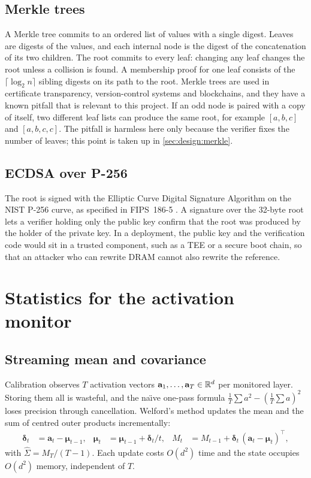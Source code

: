 \subsection{Merkle trees}
A Merkle tree \cite{merkle1987digital} commits to an ordered list of values with a single
digest. Leaves are digests of the values, and each internal node is the digest of the
concatenation of its two children. The root commits to every leaf: changing any leaf changes
the root unless a collision is found. A membership proof for one leaf consists of the
$\lceil\log_2 n\rceil$ sibling digests on its path to the root. Merkle trees are used in
certificate transparency, version-control systems and blockchains, and they have a known
pitfall that is relevant to this project. If an odd node is paired with a copy of itself, two
different leaf lists can produce the same root, for example $[a,b,c]$ and $[a,b,c,c]$. The
pitfall is harmless here only because the verifier fixes the number of leaves; this point is
taken up in \cref{sec:design:merkle}.

\subsection{ECDSA over P-256}
The root is signed with the Elliptic Curve Digital Signature Algorithm on the NIST P-256 curve,
as specified in FIPS~186-5 \cite{fips186-5}. A signature over the 32-byte root lets a verifier
holding only the public key confirm that the root was produced by the holder of the private
key. In a deployment, the public key and the verification code would sit in a trusted
component, such as a TEE or a secure boot chain, so that an attacker who can rewrite DRAM
cannot also rewrite the reference.

\section{Statistics for the activation monitor}
\label{sec:bg:stats}

\subsection{Streaming mean and covariance}
Calibration observes $T$ activation vectors $\mathbf{a}_1,\dots,\mathbf{a}_T\in\mathbb{R}^d$ per
monitored layer. Storing them all is wasteful, and the na\"\i ve one-pass formula
$\frac1T\sum a^2 - (\frac1T\sum a)^2$ loses precision through cancellation. Welford's method
\cite{welford1962note} updates the mean and the sum of centred outer products incrementally:
\begin{align}
  \boldsymbol\delta_t &= \mathbf{a}_t - \boldsymbol\mu_{t-1}, &
  \boldsymbol\mu_t &= \boldsymbol\mu_{t-1} + \boldsymbol\delta_t / t, &
  M_t &= M_{t-1} + \boldsymbol\delta_t\,(\mathbf{a}_t - \boldsymbol\mu_t)^{\top},
  \label{eq:welford}
\end{align}
with $\hat\Sigma = M_T/(T-1)$. Each update costs $O(d^2)$ time and the state occupies $O(d^2)$
memory, independent of $T$.

